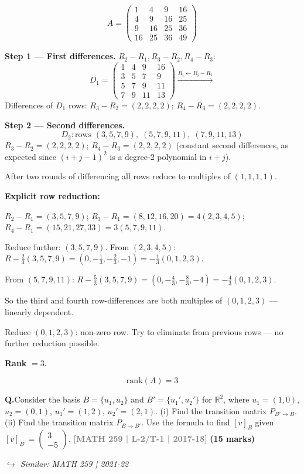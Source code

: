 \documentclass[12pt,a3paper]{article}
\newcommand{\yr}[1]{\hfill\textcolor{gray}{\small\textbf{[#1]}}}
\newcommand{\mk}[1]{\textcolor{orange!70!black}{\small\textbf{(#1 marks)}}}
\newcommand{\variant}[1]{\par\vspace{1pt}\textcolor{blue!50!black}%
  {\footnotesize\textit{$\hookrightarrow$ Similar: #1}}}
\newcounter{qnum}
\newcommand{\Q}[1]{%
  \needspace{4\baselineskip}
  \refstepcounter{qnum}
  \vspace{6pt}
  \noindent\textbf{Q\theqnum.}\enspace #1\par
}
\begin{document}
\begin{tcolorbox}[enhanced,breakable,colback=cC!4,colframe=cC,
  boxrule=0.8pt,arc=5pt,
  title={\textbf{Answer}},
  fonttitle=\bfseries\color{white},colbacktitle=cC]

\[
A=\begin{pmatrix}1&4&9&16\\4&9&16&25\\9&16&25&36\\16&25&36&49\end{pmatrix}
\]

\textbf{Step 1 --- First differences.} $R_2-R_1,R_3-R_2,R_4-R_3$:
\[
D_1=\begin{pmatrix}1&4&9&16\\3&5&7&9\\5&7&9&11\\7&9&11&13\end{pmatrix}
\xrightarrow{R_i\leftarrow R_i-R_1}
\]
Differences of $D_1$ rows: $R_3-R_2=(2,2,2,2)$; $R_4-R_3=(2,2,2,2)$.

\textbf{Step 2 --- Second differences.}
\[
D_2: \text{rows }(3,5,7,9),\;(5,7,9,11),\;(7,9,11,13)
\]
$R_3-R_2=(2,2,2,2)$; $R_4-R_3=(2,2,2,2)$ (constant second differences, as expected since $(i+j-1)^2$ is a degree-2 polynomial in $i+j$).

After two rounds of differencing all rows reduce to multiples of $(1,1,1,1)$.

\textbf{Explicit row reduction:}

$R_2-R_1=(3,5,7,9)$; $R_3-R_1=(8,12,16,20)=4(2,3,4,5)$; $R_4-R_1=(15,21,27,33)=3(5,7,9,11)$.

Reduce further: $(3,5,7,9)$. From $(2,3,4,5)$: $R-\tfrac{2}{3}(3,5,7,9)=(0,-\tfrac{1}{3},-\tfrac{2}{3},-1)=-\tfrac{1}{3}(0,1,2,3)$.

From $(5,7,9,11)$: $R-\tfrac{5}{3}(3,5,7,9)=(0,-\tfrac{4}{3},-\tfrac{8}{3},-4)=-\tfrac{4}{3}(0,1,2,3)$.

So the third and fourth row-differences are both multiples of $(0,1,2,3)$ --- linearly dependent.

Reduce $(0,1,2,3)$: non-zero row. Try to eliminate from previous rows --- no further reduction possible.

\textbf{Rank} $= 3$.

\[
\boxed{\mathrm{rank}(A)=3}
\]
\end{tcolorbox}

\Q{Consider the basis $B = \{u_1, u_2\}$ and $B' = \{u_1', u_2'\}$ for $\mathbb{R}^2$, where $u_1 = (1,0)$, $u_2 = (0,1)$, $u_1' = (1,2)$, $u_2' = (2,1)$. (i) Find the transition matrix $P_{B' \to B}$. (ii) Find the transition matrix $P_{B \to B'}$. Use the formula to find $[v]_B$ given $[v]_{B'} = \begin{pmatrix} 3 \\ -5 \end{pmatrix}$.
\yr{MATH 259 | L-2/T-1 | 2017-18} \mk{15}
\variant{MATH 259 | 2021-22}}
\end{document}
